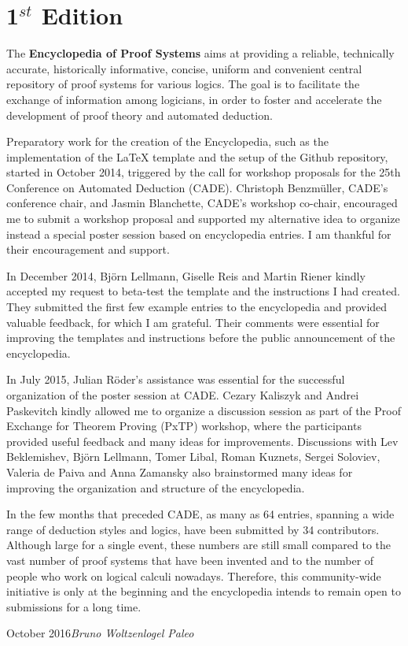 
\preface
\vspace{-150pt}
\section*{1$^{st}$ Edition}
\vspace{130pt}

The \textbf{Encyclopedia of Proof Systems} aims at providing a reliable, technically accurate, historically informative, concise, uniform and convenient central repository of proof systems for various logics. The goal is to facilitate the exchange of information among logicians, in order to foster and accelerate the development of proof theory and automated deduction.

Preparatory work for the creation of the Encyclopedia, such as the implementation of the LaTeX template and the setup of the Github repository, started in October 2014, triggered by the call for workshop proposals for the 25th Conference on Automated Deduction (CADE). Christoph Benzm\"uller, CADE's conference chair, and Jasmin Blanchette, CADE's workshop co-chair, encouraged me to submit a workshop proposal and supported my alternative idea to organize instead a special poster session based on encyclopedia entries. I am thankful for their encouragement and support.

In December 2014, Bj\"orn Lellmann, Giselle Reis and Martin Riener kindly accepted my request to beta-test the template and the instructions I had created. They submitted the first few example entries to the encyclopedia and provided valuable feedback, for which I am grateful. Their comments were essential for improving the templates and instructions before the public announcement of the encyclopedia.

In July 2015, Julian R\"oder's assistance was essential for the successful organization of the poster session at CADE. Cezary Kaliszyk and Andrei Paskevitch kindly allowed me to organize a discussion session as part of the Proof Exchange for Theorem Proving (PxTP) workshop, where the participants provided useful feedback and many ideas for improvements. Discussions with Lev Beklemishev, Bj\"orn Lellmann, Tomer Libal, Roman Kuznets, Sergei Soloviev, Valeria de Paiva and Anna Zamansky also brainstormed many ideas for improving the organization and structure of the encyclopedia.

In the few months that preceded CADE, as many as 64 entries, spanning a wide range of deduction styles and logics, have been submitted by 34 contributors. Although large for a single event, these numbers are still small compared to the vast number of proof systems that have been invented and to the number of people who work on logical calculi nowadays. Therefore, this community-wide initiative is only at the beginning and the encyclopedia intends to remain open to submissions for a long time. 

\vspace{\baselineskip}
\begin{flushright}\noindent
October 2016\hfill {\it Bruno Woltzenlogel Paleo}
\end{flushright}


